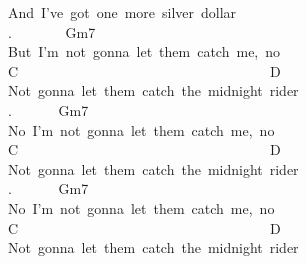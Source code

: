 {And\ I've\ got\ one\ more\ silver\ dollar\\
. \ \ \ \ \ \ \ Gm7\\
But\ I'm\ not\ gonna\ let\ them\ catch\ me,\ no\\
C\ \ \ \ \ \ \ \ \ \ \ \ \ \ \ \ \ \ \ \ \ \ \ \ \ \ \ \ \ \ \ \ \ \ \ \ D\\
Not\ gonna\ let\ them\ catch\ the\ midnight\ rider\\
. \ \ \ \ \ \ Gm7\\
No\ I'm\ not\ gonna\ let\ them\ catch\ me,\ no\\
C\ \ \ \ \ \ \ \ \ \ \ \ \ \ \ \ \ \ \ \ \ \ \ \ \ \ \ \ \ \ \ \ \ \ \ \ D\\
Not\ gonna\ let\ them\ catch\ the\ midnight\ rider\\
. \ \ \ \ \ \ Gm7\\
No\ I'm\ not\ gonna\ let\ them\ catch\ me,\ no\\
C\ \ \ \ \ \ \ \ \ \ \ \ \ \ \ \ \ \ \ \ \ \ \ \ \ \ \ \ \ \ \ \ \ \ \ \ D\\
Not\ gonna\ let\ them\ catch\ the\ midnight\ rider\ }

